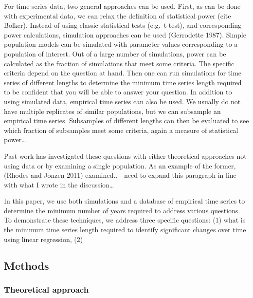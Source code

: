 \documentclass[11pt,]{article}
\begin{document}
For time series data, two general approaches can be used. First, as can
be done with experimental data, we can relax the definition of
statistical power (cite Bolker). Instead of using classic statistical
tests (e.g.~t-test), and corresponding power calculations, simulation
approaches can be used (Gerrodette 1987). Simple population models can
be simulated with parameter values corresponding to a population of
interest. Out of a large number of simulations, power can be calculated
as the fraction of simulations that meet some criteria. The specific
criteria depend on the question at hand. Then one can run simulations
for time series of different lengths to determine the minimum time
series length required to be confident that you will be able to answer
your question. In addition to using simulated data, empirical time
series can also be used. We usually do not have multiple replicates of
similar populations, but we can subsample an empirical time series.
Subsamples of different lengths can then be evaluated to see which
fraction of subsamples meet some criteria, again a measure of
statistical power\ldots{}

Past work has investigated these questions with either theoretical
approaches not using data or by examining a single population. As an
example of the former, (Rhodes and Jonzen 2011) examined.. - need to
expand this paragraph in line with what I wrote in the
discussion\ldots{}

In this paper, we use both simulations and a database of empirical time
series to determine the minimum number of years required to address
various questions. To demonstrate these techniques, we address three
specific questions: (1) what is the minimum time series length required
to identify significant changes over time using linear regression, (2)

\subsection{Methods}\label{methods}

\subsubsection{Theoretical approach}\label{theoretical-approach}
\end{document}
